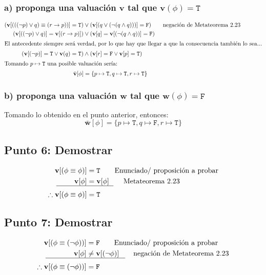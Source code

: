 \documentclass{article}
\begin{document}
\subsubsection{a) proponga una valuación $\mathbf{v}$ tal que $\mathbf{v}(\phi) = \mathtt{T}$ }

\begin{alignat*}{2}
    (\mathbf{v}[(((\lnot p)\vee q)\equiv(r \to p))] = \mathtt{T}) &\vee (\mathbf{v}[(q \vee (\lnot (q \wedge q)))] = \mathtt{F}) \tag*{negación de Metateorema 2.23}\\
    (\mathbf{v}[((\lnot p) \vee q)] = \mathbf{v}[(r \to p)]) &\vee (\mathbf{v}[q] = \mathbf{v}[(\lnot (q \wedge q))] = \mathtt{F})\\
    \intertext{El antecedente siempre será verdad, por lo que hay que llegar a que la consecuencia también lo sea...}
    (\mathbf{v}[(\lnot p)] = \mathtt{T} \vee \mathbf{v}(q) = \mathtt{T})  &\wedge (\mathbf{v}[r] = \mathtt{F} \vee \mathbf{v}[p] = \mathtt{T})\\
    \intertext{Tomando $p \mapsto \mathtt{T}$ una posible valuación sería:}
    \bar{\mathbf{v}}[\phi] &= \{p \mapsto \mathtt{T}, q \mapsto \mathtt{T}, r \mapsto \mathtt{T}\}
\end{alignat*}
\subsubsection{b)  proponga una valuación $\mathbf{w}$ tal que $\mathbf{w}(\phi) = \mathtt{F}$ }
Tomando lo obtenido en el punto anterior, entonces:
$$\bar{\mathbf{w}}[\phi] = \{p \mapsto \mathtt{T}, q \mapsto \mathtt{F}, r \mapsto \mathtt{T} \}$$
\subsection{Punto 6: Demostrar}
\begin{alignat*}{2}
    \mathbf{v}[(\phi \equiv \phi)] &= \mathtt{T} \tag*{Enunciado/ proposición a probar}\\
    \mathbf{v}[\phi] &= \mathbf{v}[\phi] \tag*{Metateorema 2.23}\\[-0.4cm]
    \makebox[1.5cm]{\hrulefill}&\makebox[1.3cm]{\hrulefill}\\
    \therefore \mathbf{v}[(\phi \equiv \phi)] &= \mathtt{T}
\end{alignat*}
\subsection{Punto 7: Demostrar}
\begin{alignat*}{2}
    \mathbf{v}[(\phi \equiv (\lnot \phi))] &= \mathtt{F} \tag*{Enunciado/ proposición a probar}\\
    \mathbf{v}[\phi] &\not= \mathbf{v}[(\lnot \phi)] \tag*{negación de Metateorema 2.23}\\[-.4cm]
    \makebox[2cm]{\hrulefill}&\makebox[1.9cm]{\hrulefill}\\
    \therefore \mathbf{v}[(\phi \equiv (\lnot \phi))] &= \mathtt{F}
\end{alignat*}
\clearpage
\end{document}
